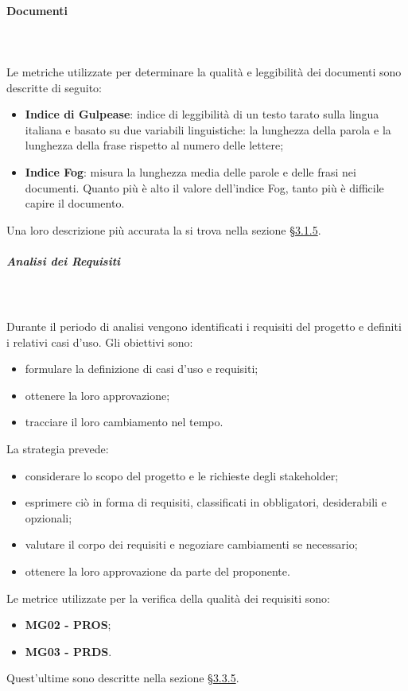 			\paragraph{Documenti}\mbox{} \\ \mbox{} \\
			Le metriche utilizzate per determinare la qualità e leggibilità dei documenti sono descritte di seguito:
			 \begin{itemize}
			\item \textbf{Indice di Gulpease}: indice di leggibilità di un testo tarato sulla lingua italiana e basato su due variabili linguistiche: la lunghezza della parola e la lunghezza della frase rispetto al numero delle lettere;
			\item \textbf{Indice Fog}: misura la lunghezza media delle parole e delle frasi nei documenti. Quanto più è alto il valore dell'indice Fog, tanto più è difficile capire il documento.
			\end{itemize}
			Una loro descrizione più accurata la si trova nella sezione \S \hyperref[par:metricheDoc]{3.1.5}.
			\subparagraph*{Analisi dei Requisiti} \mbox{} \\ \mbox{} \\
			Durante il periodo di analisi vengono identificati i requisiti del progetto e definiti i relativi casi d'uso. 
			Gli obiettivi sono:
			\begin{itemize}
			\item  formulare la definizione di casi d'uso e requisiti;
			\item ottenere la loro approvazione;
			\item tracciare il loro cambiamento nel tempo.
			\end{itemize}
			La strategia prevede:
			\begin{itemize}
			\item considerare lo scopo del progetto e le richieste degli stakeholder;
			\item esprimere ciò in forma di requisiti, classificati in obbligatori, desiderabili e opzionali;
			\item valutare il corpo dei requisiti e negoziare cambiamenti se necessario;
			\item ottenere la loro approvazione da parte del proponente.
			\end{itemize}
			Le metrice utilizzate per la verifica della qualità dei requisiti sono: \begin{itemize}
			\item \textbf{MG02 - PROS};
			\item \textbf{MG03 - PRDS}.
\end{itemize}			 
Quest'ultime sono descritte nella sezione \S \hyperref[par:metricheGen]{3.3.5}.
